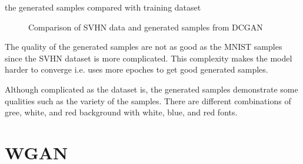 \documentclass{article}
\begin{document}
the generated samples compared with training dataset

\begin{figure}[!htb]
  \centering
  \caption{Comparison of SVHN data and generated samples from DCGAN}
  \label{fig:DCGAN_SVHN}
\end{figure}

The quality of the generated samples are not as good as the MNIST samples since the SVHN dataset is more complicated.
This complexity makes the model harder to converge i.e. uses more epoches to get good generated samples.

Although complicated as the dataset is, the generated samples demonstrate some qualities such as the variety of the samples. There are different combinations of gree, white, and red background with white, blue, and red fonts.

\section{WGAN}
\end{document}
